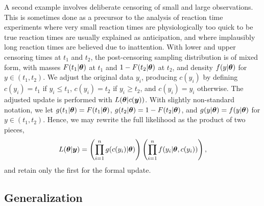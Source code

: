 \documentclass[12pt]{article}
\def\bth{\mbox{\boldmath $\theta$}}
\newcommand{\by}{\mbox{\boldmath $y$}}
\newcommand{\red}[1]{{\color{red}#1}}
\newcommand{\green}[1]{{\color{green}#1}}
\begin{document}
A second example involves deliberate censoring of small and large observations.  This is
sometimes done as a precursor to the analysis of reaction time
experiments  \citep[e.g.,][]{ratcliff1993}
\green{where very small reaction times are physiologically too quick to be true reaction times
are usually explained as anticipation, and where implausibly long reaction times are believed due to inattention. }  
With lower
and upper censoring times at $t_1$ and $t_2$, the post-censoring sampling distribution
is of mixed form, with masses $F(t_1|\bth)$ at $t_1$ and $1-F(t_2|\bth)$ at $t_2$,
and density $f(y | \bth)$ for $y \in (t_1, t_2)$.  We adjust the original data $y_i$,
producing $c(y_i)$ by defining $c(y_i)= t_1$ if $y_i \leq t_1$, $c(y_i)=t_2$ 
if $y_i \geq t_2$, and $c(y_i)=y_i$ otherwise.  
The adjusted update is performed with $L(\bth |c(\by))$.  
With slightly non-standard notation, we let $g(t_1|\bth) = F(t_1|\bth)$,
$g(t_2 | \bth) = 1 - F(t_2|\bth)$, and $g(y|\bth)=f(y|\bth)$ for
$y \in (t_1, t_2)$.
Hence, we may rewrite the full %
likelihood as the product of
two pieces, 
\begin{eqnarray}
\label{Censoring}
L(\bth | \by) =  
\left( \prod_{i=1}^n g(c(y_i)  | \bth) \right) \left( \prod_{i=1}^n f(y_i|\bth,c(y_i) ) \right) ,  
\end{eqnarray}
and retain only the first for the formal update.  

\subsection{Generalization}
\end{document}
